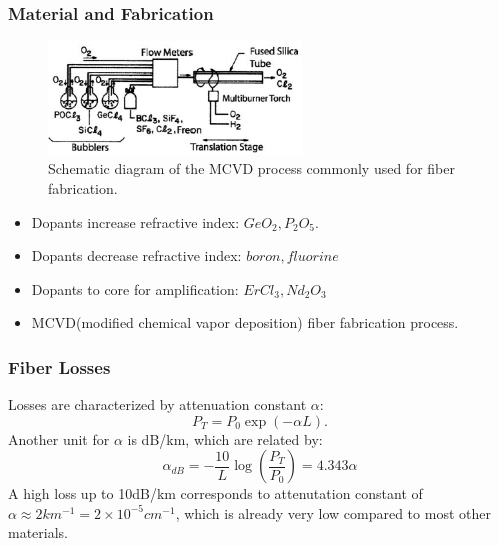 \documentclass[12pt]{extarticle}
\newcommand{\<}{\langle}
\renewcommand{\>}{\rangle}
\theoremstyle{definition}
\begin{document}
        \subsubsection{Material and Fabrication}
            \begin{figure}[htbp]
                \centering
                \includegraphics[width=0.6\textwidth]{images/fig1.2.PNG}
                \caption{Schematic diagram of the MCVD process commonly used for fiber fabrication.}
                \label{fig1.2}
            \end{figure}
            
            \begin{itemize}
                \item Dopants increase refractive index: $GeO_2, P_2O_5$.
                \item Dopants decrease refractive index: $boron, fluorine$
                \item Dopants to core for amplification: $ErCl_3, Nd_2O_3$
                \item MCVD(modified chemical vapor deposition) fiber fabrication process.
            \end{itemize}
            
        \subsubsection{Fiber Losses}
            Losses are characterized by attenuation constant $\alpha$:
                \begin{equation}
                    P_T = P_0 \exp{(-\alpha L)}.
                    \label{attenuation constant}
                \end{equation}
            Another unit for $\alpha$ is dB/km, which are related by:
                \begin{equation}
                    \alpha_{dB} = -\frac{10}{L}\log{(\frac{P_T}{P_0})} = 4.343\alpha
                \end{equation}
            A high loss up to 10dB/km corresponds to attenutation constant of \\
            $\alpha \approx 2 km^{-1} = 2\times 10^{-5}cm^{-1} $,
            which is already very low compared to most other materials.
            
\end{document}
